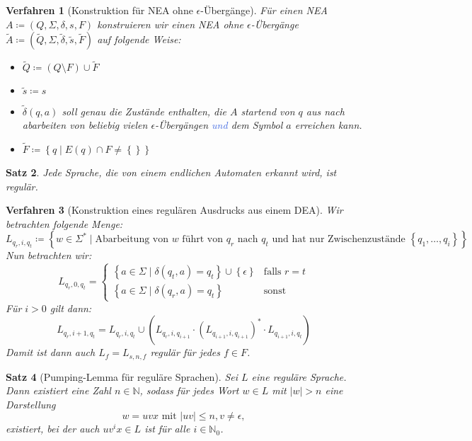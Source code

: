 \documentclass[11pt]{scrartcl}
\newcommand{\tcol}[1]{\textcolor{RoyalBlue}{#1}}
\newcommand{\set}[1]{\left\lbrace #1\right\rbrace}
\theoremstyle{break}
\newtheorem{satz}{Satz}[section]
\newtheorem{verf}[satz]{Verfahren}
\begin{document}
    \begin{verf}[Konstruktion für NEA ohne $\epsilon$-Übergänge]
        Für einen NEA $A\coloneqq (Q,\Sigma ,\delta ,s,F)$ konstruieren wir einen NEA ohne $\epsilon$-Übergänge $\tilde{A}\coloneqq (\tilde{Q},\Sigma ,\tilde{\delta},\tilde{s},\tilde{F})$ auf folgende Weise:
        \begin{itemize}
            \item $\tilde{Q}\coloneqq (Q\setminus F)\cup\tilde{F}$
            \item $\tilde{s}\coloneqq s$
            \item $\tilde{\delta}(q,a)$ soll genau die Zustände enthalten, die $A$ startend von $q$ aus nach abarbeiten von beliebig vielen $\epsilon$-Übergängen \tcol{und} dem Symbol $a$ erreichen kann.
            \item $\tilde{F}\coloneqq\set{q\mid E(q)\cap F\neq\set{}}$
        \end{itemize}
    \end{verf}

    \begin{satz}
        Jede Sprache, die von einem endlichen Automaten erkannt wird, ist regulär.
    \end{satz}

    \begin{verf}[Konstruktion eines regulären Ausdrucks aus einem DEA]
        Wir betrachten folgende Menge:
        \[L_{q_r,i,q_t}\coloneqq\set{w\in\Sigma^*\mid\text{Abarbeitung von }w\text{ führt von }q_r\text{ nach }q_t\text{ und hat nur Zwischenzustände }\set{q_1,\dots ,q_i}}\]
        Nun betrachten wir:
        \[L_{q_r,0,q_t}=
        \begin{cases}
            \set{a\in\Sigma\mid\delta (q_t,a)=q_t}\cup\set{\epsilon} & \text{falls } r=t\\
            \set{a\in\Sigma\mid\delta (q_r,a)=q_t} & \text{sonst}
        \end{cases}\]
        Für $i>0$ gilt dann:
        \[L_{q_r,i+1,q_t}=L_{q_r,i,q_t}\cup (L_{q_r,i,q_{i+1}}\cdot (L_{q_{i+1},i,q_{i+1}})^*\cdot L_{q_{i+1},i,q_t})\]
        Damit ist dann auch $L_f=L_{s,n,f}$ regulär für jedes $f\in F$.
    \end{verf}

    \begin{satz}[Pumping-Lemma für reguläre Sprachen]
        Sei $L$ eine reguläre Sprache.
        Dann existiert eine Zahl $n\in\mathbb{N}$, sodass für jedes Wort $w\in L$ mit $|w|>n$ eine Darstellung
        \[w=uvx \text{ mit } |uv|\leq n, v\neq\epsilon,\]
        existiert, bei der auch $uv^{i}x\in L$ ist für alle $i\in\mathbb{N}_0$.
    \end{satz}
\end{document}
